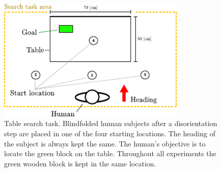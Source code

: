 \begin{figure}
 \centering
   \includegraphics[width=0.8\textwidth]{./ch3-Search/Figures/experimentsetup}
  \caption{Table search task. Blindfolded human subjects after a disorientation step are placed in one of the 
  four starting locations. The heading of the subject is always kept the same. The human's objective is to locate
  the green block on the table. Throughout all experiments the green wooden block is kept in the same location.}
  \label{fig:tab_search_task}
\end{figure}
